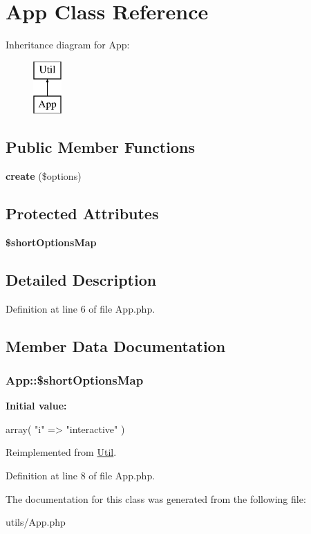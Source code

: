 \hypertarget{class_app}{
\section{App Class Reference}
\label{class_app}
}
Inheritance diagram for App:\begin{figure}[H]
\begin{center}
\leavevmode
\includegraphics[height=2.000000cm]{class_app}
\end{center}
\end{figure}
\subsection*{Public Member Functions}
\begin{DoxyCompactItemize}
\item 
\hypertarget{class_app_a6bd823fa4a180393bce2c7a164754d89}{
{\bfseries create} (\$options)}
\label{class_app_a6bd823fa4a180393bce2c7a164754d89}

\end{DoxyCompactItemize}
\subsection*{Protected Attributes}
\begin{DoxyCompactItemize}
\item 
{\bfseries \$shortOptionsMap}
\end{DoxyCompactItemize}


\subsection{Detailed Description}


Definition at line 6 of file App.php.



\subsection{Member Data Documentation}
\hypertarget{class_app_a20ce30657288c1c88221fde367666c40}{
\subsubsection[{\$shortOptionsMap}]{\setlength{\rightskip}{0pt plus 5cm}App::\$shortOptionsMap}}
\label{class_app_a20ce30657288c1c88221fde367666c40}
{\bfseries Initial value:}
\begin{DoxyCode}
 array(
        "i" => "interactive"
    )
\end{DoxyCode}


Reimplemented from \hyperlink{class_util}{Util}.



Definition at line 8 of file App.php.



The documentation for this class was generated from the following file:\begin{DoxyCompactItemize}
\item 
utils/App.php\end{DoxyCompactItemize}
